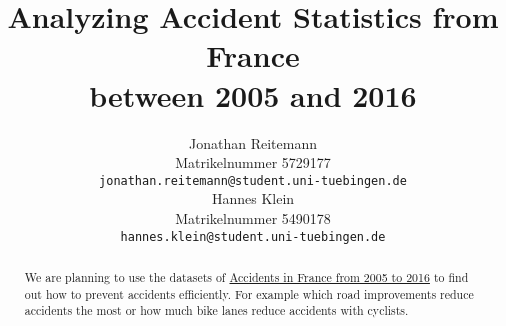 \documentclass{article}
\title{Analyzing Accident Statistics from France \\ between 2005 and 2016}
\author{%
  Jonathan Reitemann\\
  Matrikelnummer 5729177\\
  \texttt{jonathan.reitemann@student.uni-tuebingen.de} \\
  \And
  Hannes Klein\\
  Matrikelnummer 5490178\\
  \texttt{hannes.klein@student.uni-tuebingen.de} \\
}
\begin{document}
\maketitle

\begin{abstract}
  We are planning to use the datasets of \href{https://www.kaggle.com/ahmedlahlou/accidents-in-france-from-2005-to-2016?select=caracteristics.csv}{Accidents in France from 2005 to 2016} to find out how to prevent accidents efficiently. For example which road improvements reduce accidents the most or how much bike lanes reduce accidents with cyclists.
\end{abstract}
\end{document}
